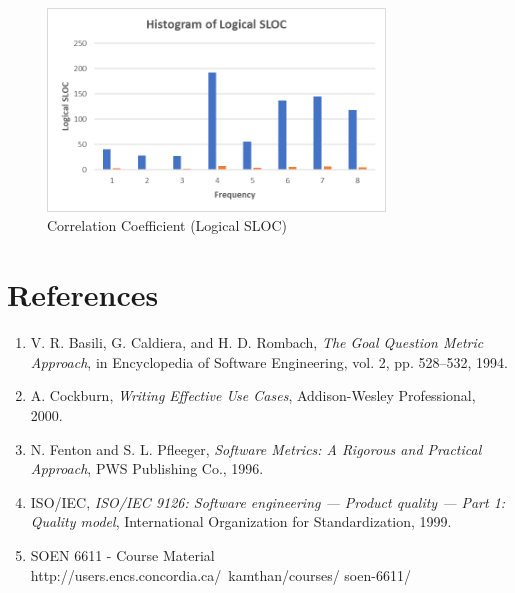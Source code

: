 \documentclass[english,12pt,a4paper]{report}
\begin{document}
	\begin{figure}[H]
		\centering
		\includegraphics[width=0.8\textwidth]{images/HIstoSLOC.png}
		\caption{Correlation Coefficient (Logical SLOC)}
		\label{fig:Correlation Coefficient (Logical SLOC)}
	\end{figure}
	
	\chapter{References}
	\begin{enumerate}
		\renewcommand{\labelenumi}{[\theenumi]}
		\item V. R. Basili, G. Caldiera, and H. D. Rombach, \textit{The Goal Question Metric Approach}, in Encyclopedia of Software Engineering, vol. 2, pp. 528--532, 1994.
		\item A. Cockburn, \textit{Writing Effective Use Cases}, Addison-Wesley Professional, 2000.
		\item N. Fenton and S. L. Pfleeger, \textit{Software Metrics: A Rigorous and Practical Approach}, PWS Publishing Co., 1996.
		\item ISO/IEC, \textit{ISO/IEC 9126: Software engineering — Product quality — Part 1: Quality model}, International Organization for Standardization, 1999.
		\item SOEN 6611 - Course Material http://users.encs.concordia.ca/~kamthan/courses/
		soen-6611/
	\end{enumerate}
	
\end{document}
